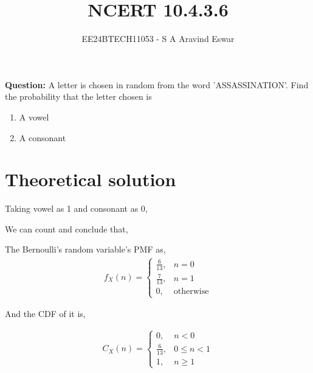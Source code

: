 \documentclass[journal]{IEEEtran}
\begin{document}

\vspace{3cm}

\title{NCERT 10.4.3.6}
\author{EE24BTECH11053 - S A Aravind Eswar}
{\let\newpage\relax\maketitle}

\renewcommand{\thefigure}{\theenumi}
\renewcommand{\thetable}{\theenumi}
\setlength{\intextsep}{10pt} %

\textbf{Question:} A letter is chosen in random from the word 'ASSASSINATION'. Find the probability that the letter chosen is
\begin{enumerate}
    \item A vowel
    \item A consonant
\end{enumerate}

\section{Theoretical solution}
    Taking vowel as 1 and consonant as 0,

    We can count and conclude that,

    The Bernoulli's random variable's PMF as,
    \begin{align}
        f_X(n) = \begin{cases}
            \frac{6}{13},& n=0\\
            \frac{7}{13},& n=1\\
            0,& \text{otherwise}
        \end{cases}
    \end{align}

    And the CDF of it is,

    \begin{align}
        C_X(n) = \begin{cases}
            0,& n<0\\
            \frac{6}{13},& 0\leq n<1\\
            1,&n\geq1
        \end{cases}
    \end{align}
\end{document}

